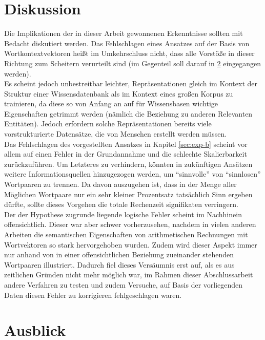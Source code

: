 \section{Diskussion}

Die Implikationen der in dieser Arbeit gewonnenen Erkenntnisse sollten mit Bedacht diskutiert werden. Das Fehlschlagen
eines Ansatzes auf der Basis von Wortkontextvektoren heißt im Umkehrschluss nicht, dass alle Vorstöße in dieser
Richtung zum Scheitern verurteilt sind (im Gegenteil soll darauf in \ref{sec:fazit-ausblick} eingegangen werden).\\
Es scheint jedoch unbestreitbar leichter, Repräsentationen gleich im Kontext der Struktur einer Wissensdatenbank als im
Kontext eines großen Korpus zu trainieren, da diese so von Anfang an auf für Wissensbasen wichtige Eigenschaften getrimmt werden
(nämlich die Beziehung zu anderen Relevanten Entitäten). Jedoch erfordern solche Repräsentationen bereits viele
vorstrukturierte Datensätze, die von Menschen erstellt werden müssen.\\

Das Fehlschlagen des vorgestellten Ansatzes in Kapitel \ref{sec:exp-b} scheint vor allem auf einen Fehler in der
Grundannahme und die schlechte Skalierbarkeit zurückzuführen. Um Letzteres zu verhindern, könnten in zukünftigen Ansätzen
weitere Informationsquellen hinzugezogen werden, um ``sinnvolle'' von ``sinnlosen'' Wortpaaren zu trennen. Da davon
auszugehen ist, dass in der Menge aller Möglichen Wortpaare nur ein sehr kleiner Prozentsatz tatsächlich Sinn ergeben
dürfte, sollte dieses Vorgehen die totale Rechenzeit signifikaten verringern.\\
Der der Hypothese zugrunde liegende logische Fehler scheint im Nachhinein offensichtlich. Dieser war aber schwer
vorherzusehen, nachdem in vielen anderen Arbeiten die semantischen Eigenschaften von arithmetischen Rechnungen mit
Wortvektoren so stark hervorgehoben wurden. Zudem wird dieser Aspekt immer nur anhand von in einer offensichtlichen
Beziehung zueinander stehenden Wortpaaren illustriert. Dadurch fiel dieses Versäumnis erst auf, als es aus zeitlichen Gründen
nicht mehr möglich war, im Rahmen dieser Abschlussarbeit andere Verfahren zu testen und zudem Versuche, auf Basis der
vorliegenden Daten diesen Fehler zu korrigieren fehlgeschlagen waren.

\section{Ausblick}\label{sec:fazit-ausblick}

